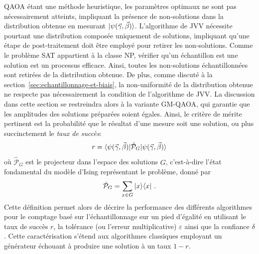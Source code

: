 QAOA étant une méthode heuristique, les paramètres optimaux ne sont pas nécessairement atteints, impliquant la présence de non-solutions dans la distribution obtenue en mesurant $\ket{\psi(\vec{\gamma}, \vec{\beta})}$. L'algorithme de JVV nécessite pourtant une distribution composée uniquement de solutions, impliquant qu'une étape de post-traitement doit être employé pour retirer les non-solutions. Comme le problème SAT appartient à la classe \textsf{NP}, vérifier qu'un échantillon est une solution est un processus efficace. Ainsi, toutes les non-solutions échantillonnées sont retirées de la distribution obtenue. De plus, comme discuté à la section~\ref{sec:echantillonnage-et-biais}, la non-uniformité de la distribution obtenue ne respecte pas nécessairement la condition de l'algorithme de JVV. La discussion dans cette section se restreindra alors à la variante GM-QAOA, qui garantie que les amplitudes des solutions préparées soient égales. Ainsi, le critère de mérite pertinent est la probabilité que le résultat d'une mesure soit une solution, ou plus succinctement le \textit{taux de succès}:
\begin{equation}
    r = \braket{ \psi(\vec{\gamma}, \vec{\beta}) | \hat{\mathcal{P}}_{G} | \psi(\vec{\gamma}, \vec{\beta}) }
\end{equation}
où $\hat{\mathcal{P}}_{G}$ est le projecteur dans l'espace des solutions $G$, c'est-à-dire l'état fondamental du modèle d'Ising représentant le problème, donné par
\begin{equation}
    \hat{\mathcal{P}}_{G} = \sum_{x \in G} \ket{x}\!\bra{x} \,.
\end{equation}
Cette définition permet alors de décrire la performance des différents algorithmes pour le comptage basé sur l'échantillonnage sur un pied d'égalité en utilisant le taux de succès $r$, la tolérance (ou l'erreur multiplicative) $\varepsilon$ ainsi que la confiance $\delta$. Cette caractérisation s'étend aux algorithmes classiques employant un générateur échouant à produire une solution à un taux $1 - r$.


